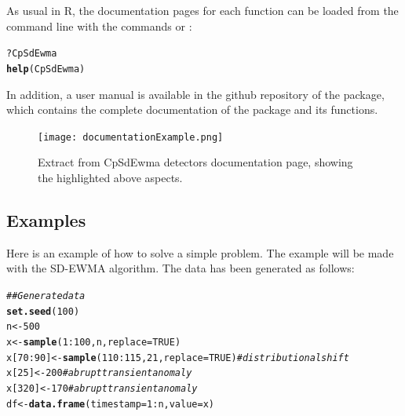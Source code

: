 \documentclass[a4paper]{article}\usepackage[]{graphicx}\usepackage[]{color}
\makeatletter
\newcommand{\hlnum}[1]{\textcolor[rgb]{0.686,0.059,0.569}{#1}}%
\newcommand{\hlcom}[1]{\textcolor[rgb]{0.678,0.584,0.686}{\textit{#1}}}%
\newcommand{\hlopt}[1]{\textcolor[rgb]{0,0,0}{#1}}%
\newcommand{\hlstd}[1]{\textcolor[rgb]{0.345,0.345,0.345}{#1}}%
\newcommand{\hlkwb}[1]{\textcolor[rgb]{0.69,0.353,0.396}{#1}}%
\newcommand{\hlkwc}[1]{\textcolor[rgb]{0.333,0.667,0.333}{#1}}%
\newcommand{\hlkwd}[1]{\textcolor[rgb]{0.737,0.353,0.396}{\textbf{#1}}}%
\newenvironment{kframe}{%
 \def\at@end@of@kframe{}%
 \ifinner\ifhmode%
  \def\at@end@of@kframe{\end{minipage}}%
  \begin{minipage}{\columnwidth}%
 \fi\fi%
 \def\FrameCommand##1{\hskip\@totalleftmargin \hskip-\fboxsep
 \colorbox{shadecolor}{##1}\hskip-\fboxsep
     \hskip-\linewidth \hskip-\@totalleftmargin \hskip\columnwidth}%
 \MakeFramed {\advance\hsize-\width
   \@totalleftmargin\z@ \linewidth\hsize
   \@setminipage}}%
 {\par\unskip\endMakeFramed%
 \at@end@of@kframe}
\newenvironment{knitrout}{}{} %
\makeatother
\begin{document}
As usual in R, the documentation pages for each function can be loaded from the command line with the commands  or :

\begin{knitrout}
\color{fgcolor}\begin{kframe}
\begin{alltt}
\hlopt{?}\hlstd{CpSdEwma}
\hlkwd{help}\hlstd{(CpSdEwma)}
\end{alltt}
\end{kframe}
\end{knitrout}

In addition, a user manual is available in the github repository of the   package, which contains the complete documentation of the package and its functions.

\begin{figure}[htbp]
\centering
\texttt{[image: documentationExample.png]}
\caption{Extract from CpSdEwma detectors documentation page, showing the highlighted above aspects.}
\label{fig:documentation}
\end{figure}

\newpage

\subsection{Examples}\label{sec:examples}

Here is an example of how to solve a simple problem. The example will be made with the SD-EWMA algorithm. The data has been generated as follows:

\begin{knitrout}
\color{fgcolor}\begin{kframe}
\begin{alltt}
\hlcom{## Generate data}
\hlkwd{set.seed}\hlstd{(}\hlnum{100}\hlstd{)}
\hlstd{n} \hlkwb{<-} \hlnum{500}
\hlstd{x} \hlkwb{<-} \hlkwd{sample}\hlstd{(}\hlnum{1}\hlopt{:}\hlnum{100}\hlstd{, n,} \hlkwc{replace} \hlstd{=} \hlnum{TRUE}\hlstd{)}
\hlstd{x[}\hlnum{70}\hlopt{:}\hlnum{90}\hlstd{]} \hlkwb{<-} \hlkwd{sample}\hlstd{(}\hlnum{110}\hlopt{:}\hlnum{115}\hlstd{,} \hlnum{21}\hlstd{,} \hlkwc{replace} \hlstd{=} \hlnum{TRUE}\hlstd{)} \hlcom{# distributional shift}
\hlstd{x[}\hlnum{25}\hlstd{]} \hlkwb{<-} \hlnum{200} \hlcom{# abrupt transient anomaly}
\hlstd{x[}\hlnum{320}\hlstd{]} \hlkwb{<-} \hlnum{170} \hlcom{# abrupt transient anomaly}
\hlstd{df} \hlkwb{<-} \hlkwd{data.frame}\hlstd{(}\hlkwc{timestamp} \hlstd{=} \hlnum{1}\hlopt{:}\hlstd{n,} \hlkwc{value} \hlstd{= x)}
\end{alltt}
\end{kframe}
\end{knitrout}
\end{document}
